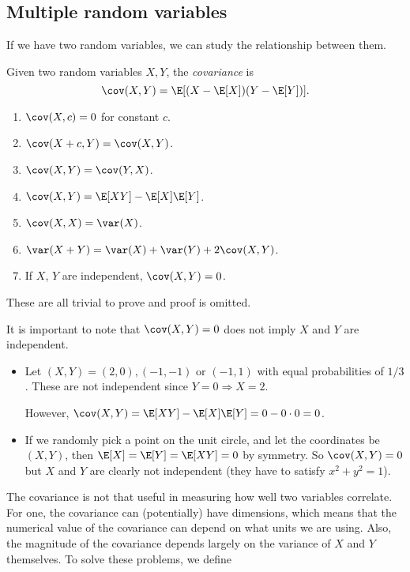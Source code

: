 \documentclass[a4paper]{article}
\begin{document}
\subsection{Multiple random variables}
If we have two random variables, we can study the relationship between them.

\begin{defi}[Covariance]
  Given two random variables $X, Y$, the \emph{covariance} is
  \[
    \cov(X, Y) = \E[(X - \E[X])(Y - \E[Y])].
  \]
\end{defi}

\begin{prop}\leavevmode
  \begin{enumerate}
    \item $\cov(X, c) = 0$ for constant $c$.
    \item $\cov(X + c, Y) = \cov (X, Y)$.
    \item $\cov (X, Y) = \cov (Y, X)$.
    \item $\cov (X, Y) = \E[XY] - \E[X]\E[Y]$.
    \item $\cov (X, X) = \var (X)$.
    \item $\var (X + Y) = \var (X) + \var (Y) + 2\cov (X, Y)$.
    \item If $X$, $Y$ are independent, $\cov(X, Y) = 0$.
  \end{enumerate}
\end{prop}
These are all trivial to prove and proof is omitted.

It is important to note that $\cov(X, Y) = 0$ does not imply $X$ and $Y$ are independent.
\begin{eg}\leavevmode
  \begin{itemize}
    \item Let $(X, Y) = (2, 0), (-1, -1)$ or $(-1, 1)$ with equal probabilities of $1/3$. These are not independent since $Y = 0\Rightarrow X = 2$.

      However, $\cov (X, Y) = \E[XY] - \E[X]\E[Y] = 0 - 0\cdot 0 = 0$.

    \item If we randomly pick a point on the unit circle, and let the coordinates be $(X, Y)$, then $\E[X] = \E[Y] = \E[XY] = 0$ by symmetry. So $\cov(X, Y) = 0$ but $X$ and $Y$ are clearly not independent (they have to satisfy $x^2 + y^2 = 1$).
  \end{itemize}
\end{eg}

The covariance is not that useful in measuring how well two variables correlate. For one, the covariance can (potentially) have dimensions, which means that the numerical value of the covariance can depend on what units we are using. Also, the magnitude of the covariance depends largely on the variance of $X$ and $Y$ themselves. To solve these problems, we define
\end{document}
